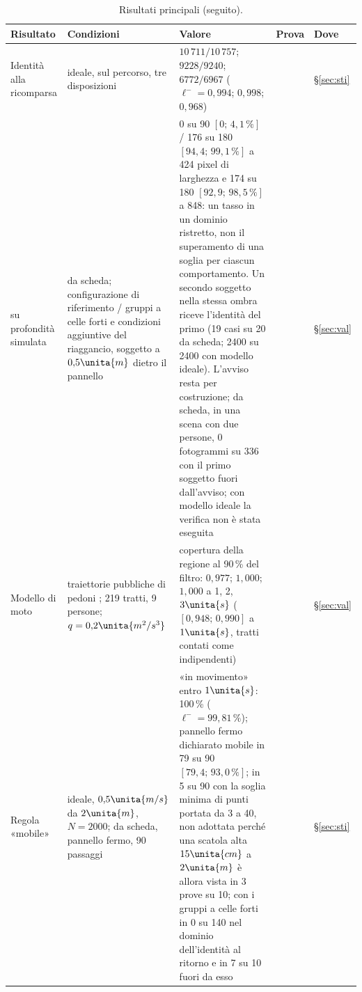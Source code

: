 \begin{table}[p]
\begin{tabularx}{\textwidth}{@{}>{\RaggedRight\arraybackslash}p{2.8cm}>{\RaggedRight\arraybackslash}p{4.1cm}L>{\RaggedRight\arraybackslash}p{1.2cm}>{\RaggedRight\arraybackslash}p{1.05cm}@{}}
\bottomrule
\end{tabularx}
\end{table}

\begin{table}[p]
\centering\footnotesize
\setlength{\tabcolsep}{4pt}\renewcommand{\arraystretch}{0.92}
\caption{Risultati principali (seguito).}\label{tab:intro-sintesi-due}
\begin{tabularx}{\textwidth}{@{}>{\RaggedRight\arraybackslash}p{2.8cm}>{\RaggedRight\arraybackslash}p{4.1cm}L>{\RaggedRight\arraybackslash}p{1.2cm}>{\RaggedRight\arraybackslash}p{1.05cm}@{}}
\toprule
Risultato & Condizioni & Valore & Prova & Dove\\
\midrule
Identità alla ricomparsa & ideale, sul percorso, tre disposizioni & $10\,711/10\,757$; $9228/9240$; $6772/6967$ ($\ell^-=0{,}994$; $0{,}998$; $0{,}968$) &  & \S\ref{sec:sti}\\
\quad su profondità simulata & da scheda; configurazione di riferimento / gruppi a celle forti e condizioni aggiuntive del riaggancio, soggetto a $0{,}5\unita{m}$ dietro il pannello & 0 su 90 $[0;\,4{,}1\,\%]$ / 176 su 180 $[94{,}4;\,99{,}1\,\%]$ a 424 pixel di larghezza e 174 su 180 $[92{,}9;\,98{,}5\,\%]$ a 848: un tasso in un dominio ristretto, non il superamento di una soglia per ciascun comportamento. Un secondo soggetto nella stessa ombra riceve l'identità del primo (19 casi su 20 da scheda; 2400 su 2400 con modello ideale). L'avviso resta per costruzione; da scheda, in una scena con due persone, 0 fotogrammi su 336 con il primo soggetto fuori dall'avviso; con modello ideale la verifica non è stata eseguita &  & \S\ref{sec:val}\\
Modello di moto & traiettorie pubbliche di pedoni \cite{thor}; 219 tratti, 9 persone; $q=0{,}2\unita{m^2/s^3}$ & copertura della regione al 90\,\% del filtro: $0{,}977$; $1{,}000$; $1{,}000$ a 1, 2, $3\unita{s}$ ($[0{,}948;\,0{,}990]$ a $1\unita{s}$, tratti contati come indipendenti) &  & \S\ref{sec:val}\\
Regola «mobile» & ideale, $0{,}5\unita{m/s}$ da $2\unita{m}$, $N=2000$; da scheda, pannello fermo, 90 passaggi & «in movimento» entro $1\unita{s}$: 100\,\% ($\ell^-=99{,}81\,\%$); pannello fermo dichiarato mobile in 79 su 90 $[79{,}4;\,93{,}0\,\%]$; in 5 su 90 con la soglia minima di punti portata da 3 a 40, non adottata perché una scatola alta $15\unita{cm}$ a $2\unita{m}$ è allora vista in 3 prove su 10; con i gruppi a celle forti in 0 su 140 nel dominio dell'identità al ritorno e in 7 su 10 fuori da esso &  & \S\ref{sec:sti}\\

\end{tabularx}
\end{table}
